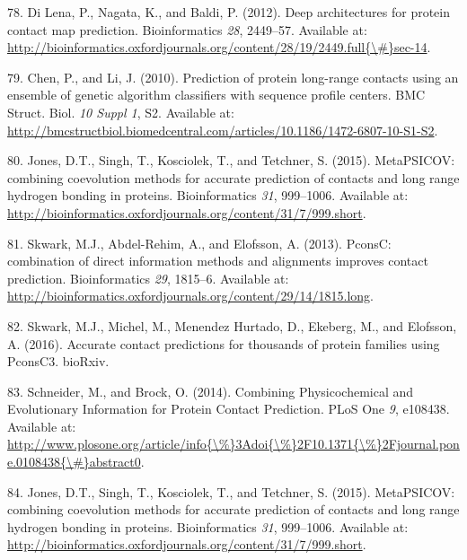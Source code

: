 \documentclass[11pt,a4paper,twoside]{book}
\theoremstyle{definition}
\theoremstyle{definition}
\theoremstyle{remark}
\begin{document}
\hypertarget{ref-DiLena2012a}{}
78. Di Lena, P., Nagata, K., and Baldi, P. (2012). Deep architectures
for protein contact map prediction. Bioinformatics \emph{28}, 2449--57.
Available at:
\href{http://bioinformatics.oxfordjournals.org/content/28/19/2449.full\%7B/\#\%7Dsec-14}{http://bioinformatics.oxfordjournals.org/content/28/19/2449.full\{\textbackslash{}\#\}sec-14}.

\hypertarget{ref-Chen2010}{}
79. Chen, P., and Li, J. (2010). Prediction of protein long-range
contacts using an ensemble of genetic algorithm classifiers with
sequence profile centers. BMC Struct. Biol. \emph{10 Suppl 1}, S2.
Available at:
\url{http://bmcstructbiol.biomedcentral.com/articles/10.1186/1472-6807-10-S1-S2}.

\hypertarget{ref-Jones2015}{}
80. Jones, D.T., Singh, T., Kosciolek, T., and Tetchner, S. (2015).
MetaPSICOV: combining coevolution methods for accurate prediction of
contacts and long range hydrogen bonding in proteins. Bioinformatics
\emph{31}, 999--1006. Available at:
\url{http://bioinformatics.oxfordjournals.org/content/31/7/999.short}.

\hypertarget{ref-Skwark2013}{}
81. Skwark, M.J., Abdel-Rehim, A., and Elofsson, A. (2013). PconsC:
combination of direct information methods and alignments improves
contact prediction. Bioinformatics \emph{29}, 1815--6. Available at:
\url{http://bioinformatics.oxfordjournals.org/content/29/14/1815.long}.

\hypertarget{ref-Skwark2016}{}
82. Skwark, M.J., Michel, M., Menendez Hurtado, D., Ekeberg, M., and
Elofsson, A. (2016). Accurate contact predictions for thousands of
protein families using PconsC3. bioRxiv.

\hypertarget{ref-Schneider2014}{}
83. Schneider, M., and Brock, O. (2014). Combining Physicochemical and
Evolutionary Information for Protein Contact Prediction. PLoS One
\emph{9}, e108438. Available at:
\href{http://www.plosone.org/article/info\%7B/\%\%7D3Adoi\%7B/\%\%7D2F10.1371\%7B/\%\%7D2Fjournal.pone.0108438\%7B/\#\%7Dabstract0}{http://www.plosone.org/article/info\{\textbackslash{}\%\}3Adoi\{\textbackslash{}\%\}2F10.1371\{\textbackslash{}\%\}2Fjournal.pone.0108438\{\textbackslash{}\#\}abstract0}.

\hypertarget{ref-Jones2015a}{}
84. Jones, D.T., Singh, T., Kosciolek, T., and Tetchner, S. (2015).
MetaPSICOV: combining coevolution methods for accurate prediction of
contacts and long range hydrogen bonding in proteins. Bioinformatics
\emph{31}, 999--1006. Available at:
\url{http://bioinformatics.oxfordjournals.org/content/31/7/999.short}.
\end{document}
